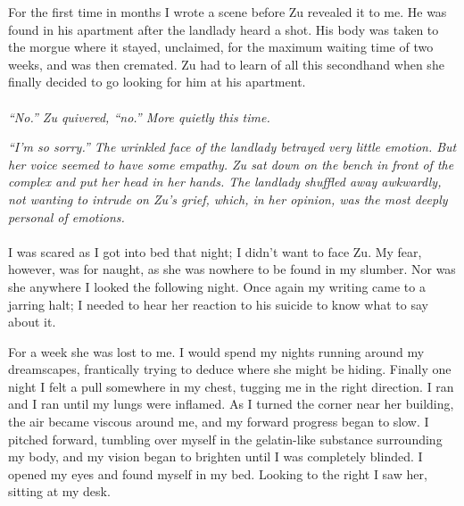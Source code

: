 	For the first time in months I wrote a scene before Zu revealed it to me. He was found in his apartment after the landlady heard a shot. His body was taken to the morgue where it stayed, unclaimed, for the maximum waiting time of two weeks, and was then cremated. Zu had to learn of all this secondhand when she finally decided to go looking for him at his apartment. 
\\\\	
\textit{	“No.” Zu quivered, “no.” More quietly this time.}
	
\textit{	“I’m so sorry.” The wrinkled face of the landlady betrayed very little emotion. But her voice seemed to have some empathy. Zu sat down on the bench in front of the complex and put her head in her hands. The landlady shuffled away awkwardly, not wanting to intrude on Zu’s grief, which, in her opinion, was the most deeply personal of emotions.}
\\\\	
	I was scared as I got into bed that night; I didn’t want to face Zu. My fear, however, was for naught, as she was nowhere to be found in my slumber. Nor was she anywhere I looked the following night. Once again my writing came to a jarring halt; I needed to hear her reaction to his suicide to know what to say about it.
	
	For a week she was lost to me. I would spend my nights running around my dreamscapes, frantically trying to deduce where she might be hiding. Finally one night I felt a pull somewhere in my chest, tugging me in the right direction. I ran and I ran until my lungs were inflamed. As I turned the corner near her building, the air became viscous around me, and my forward progress began to slow. I pitched forward, tumbling over myself in the gelatin-like substance surrounding my body, and my vision began to brighten until I was completely blinded. I opened my eyes and found myself in my bed. Looking to the right I saw her, sitting at my desk.
	
